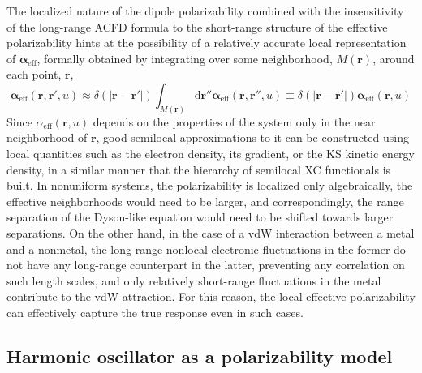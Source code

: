 The localized nature of the dipole polarizability combined with the insensitivity of the long-range ACFD formula to the short-range structure of the effective polarizability hints at the possibility of a relatively accurate local representation of $\boldsymbol\alpha_\text{eff}$, formally obtained by integrating over some neighborhood, $M(\mathbf r)$, around each point, $\mathbf r$,
\begin{equation}
  \boldsymbol\alpha_\text{eff}(\mathbf r,\mathbf r',u)\approx\delta(|\mathbf r-\mathbf r'|)\int_{M(\mathbf r)}\mathrm d\mathbf r''\boldsymbol\alpha_\text{eff}(\mathbf r,\mathbf r'',u)\equiv\delta(|\mathbf r-\mathbf r'|)\boldsymbol\alpha_\text{eff}(\mathbf r,u)
\end{equation}
Since $\alpha_\text{eff}(\mathbf r,u)$ depends on the properties of the system only in the near neighborhood of $\mathbf r$, good semilocal approximations to it can be constructed using local quantities such as the electron density, its gradient, or the KS kinetic energy density, in a similar manner that the hierarchy of semilocal XC functionals is built.
In nonuniform systems, the polarizability is localized only algebraically, the effective neighborhoods would need to be larger, and correspondingly, the range separation of the Dyson-like equation would need to be shifted towards larger separations.
On the other hand, in the case of a vdW interaction between a metal and a nonmetal, the long-range nonlocal electronic fluctuations in the former do not have any long-range counterpart in the latter, preventing any correlation on such length scales, and only relatively short-range fluctuations in the metal contribute to the vdW attraction.
For this reason, the local effective polarizability can effectively capture the true response even in such cases.

\subsection{Harmonic oscillator as a polarizability model}


